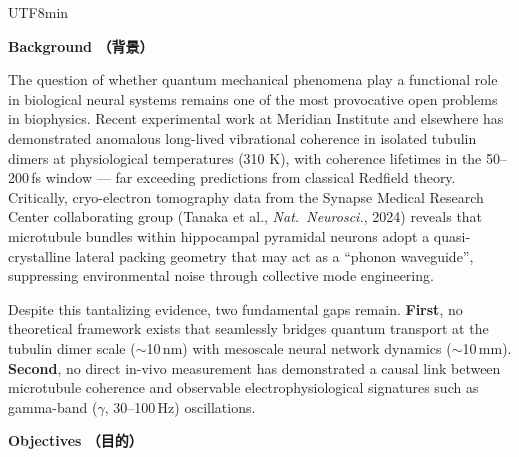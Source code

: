 \documentclass[11pt,a4paper]{article}
\newcommand{\bilabel}[2]{%
  \textbf{\textcolor{jspsNavy}{#1}}\enspace{\footnotesize\textcolor{jspsSlate}{(#2)}}%
}
\begin{document}
\begin{CJK}{UTF8}{min}
\begin{tcolorbox}[jspsSection,
  title={\faUser\enspace \bilabel{Applicant Information}{申請者情報} \hfill \small Section 1}]
\end{tcolorbox}

\vspace{4pt}

\begin{tcolorbox}[jspsSection,
  title={\faFile\enspace \bilabel{Research Background and Objectives}{研究の背景と目的} \hfill \small Section 2}]

\textbf{\textcolor{jspsNavy}{Background \textcolor{jspsSlate}{\small（背景）}}}

The question of whether quantum mechanical phenomena play a functional role in biological neural systems remains one of the most provocative open problems in biophysics. Recent experimental work at Meridian Institute and elsewhere has demonstrated anomalous long-lived vibrational coherence in isolated tubulin dimers at physiological temperatures (310 K), with coherence lifetimes in the 50--200\,fs window --- far exceeding predictions from classical Redfield theory. Critically, cryo-electron tomography data from the Synapse Medical Research Center collaborating group (Tanaka et al., \textit{Nat.\ Neurosci.}, 2024) reveals that microtubule bundles within hippocampal pyramidal neurons adopt a quasi-crystalline lateral packing geometry that may act as a ``phonon waveguide'', suppressing environmental noise through collective mode engineering.

Despite this tantalizing evidence, two fundamental gaps remain. \textbf{First}, no theoretical framework exists that seamlessly bridges quantum transport at the tubulin dimer scale ($\sim$10\,nm) with mesoscale neural network dynamics ($\sim$10\,mm). \textbf{Second}, no direct in-vivo measurement has demonstrated a causal link between microtubule coherence and observable electrophysiological signatures such as gamma-band ($\gamma$, 30--100\,Hz) oscillations.

\vspace{4pt}
\textbf{\textcolor{jspsNavy}{Objectives \textcolor{jspsSlate}{\small（目的）}}}


\end{tcolorbox}
\end{CJK}
\end{document}
